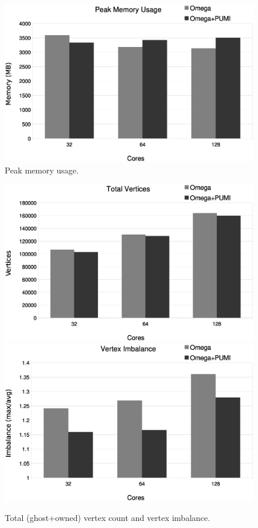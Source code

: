 \documentclass[a4paper]{article}
\begin{document}
\begin{figure}[ht]
\centering
  \includegraphics[width=\textwidth]{peak-memory-usage.eps}
  \caption{\label{fig:memusage} Peak memory usage.}
\end{figure}

\begin{figure}[ht]
\centering
  \includegraphics[width=\textwidth]{total-vtx.eps} \\
  \includegraphics[width=\textwidth]{vtx-imb.eps} \\
  \caption{\label{fig:vtx} Total (ghost+owned) vertex count and vertex imbalance.}
\end{figure}
\end{document}
